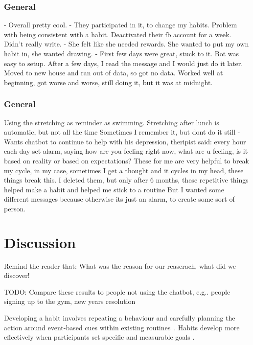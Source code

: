 \documentclass{scaffold/sigchi}
\begin{document}
\subsubsection{General}
  - Overall pretty cool.
  - They participated in it, to change my habits. Problem with being consistent with a habit. Deactivated their fb account for a week. Didn't really write.
  - She felt like she needed rewards. She wanted to put my own habit in, she wanted drawing.
  - First few days were great, stuck to it. Bot was easy to setup. After a few days, I read the message and I would just do it later. Moved to new house and ran out of data, so got no data. Worked well at beginning, got worse and worse, still doing it, but it was at midnight.



\subsubsection{General}
Using the stretching as reminder as swimming.
Stretching after lunch is automatic, but not all the time
Sometimes I remember it, but dont do it still
- Wants chatbot to continue to help with his depression, theripist said: every hour each day set alarm, saying how are you feeling right now, what are u feeling, is it based on reality or based on expectations? These for me are very helpful to break my cycle, in my case, sometimes I get a thought and it cycles in my head, these things break this. I deleted them, but only after 6 months, these repetitive things helped make a habit and helped me stick to a routine
But I wanted some different messages because otherwise its just an alarm, to create some sort of person.



\section{Discussion}
Remind the reader that: What was the reason for our reaserach, what did we discover!

TODO: Compare these results to people not using the chatbot, e.g.. people signing up to the gym, new years resolution

Developing a habit involves repeating a behaviour and carefully planning the action around event-based cues within existing routines~\cite{habits_event_cues_1, habits_event_cues_2}. Habits develop more effectively when participants set specific and measurable goals \cite{habits_better_when_have_specific_and_measurable_goals}.
\end{document}
